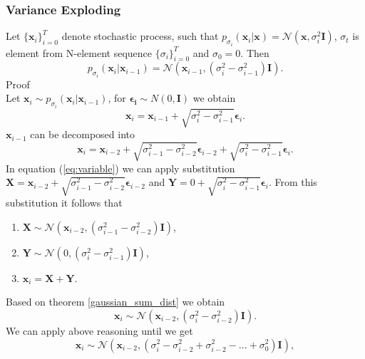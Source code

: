 \documentclass[10pt]{article}
\begin{document}
\subsubsection{Variance Exploding}
Let $\{ \textbf{x}_i \}_{i=0}^T$ denote stochastic process, such that $p_{\sigma_i}(\textbf{x}_i | \textbf{x}) = \mathcal{N}(\textbf{x}, \sigma_i^2 \mathbf{I})$, $\sigma_t$ is element from N-element sequence $\{ \sigma_i\}_{i=0}^T$ and $\sigma_0 = 0$. Then
\begin{equation}
    p_{\sigma_i}(\textbf{x}_i | \textbf{x}_{i-1}) = \mathcal{N}(\textbf{x}_{i-1},
    (\sigma_i^2 - \sigma_{i-1}^2) \mathbf{I}).
\end{equation}
Proof \\ 
Let $\textbf{x}_i \sim  p_{\sigma_i}(\textbf{x}_i | \textbf{x}_{i-1})$, for $\bm{\epsilon_{i}} \sim N(0, \mathbf{I}) $ we obtain
\begin{equation} \label{eq:ve_dics}
        \textbf{x}_i = \textbf{x}_{i-1} +  \sqrt{\sigma_i^2 - \sigma_{i-1}^2} \bm{\epsilon}_{i}.
\end{equation}
$\textbf{x}_{i-1}$ can be decomposed into 
\begin{equation}
\label{eq:variable}
        \textbf{x}_i = \textbf{x}_{i-2} + \sqrt{\sigma_{i-1}^2 - \sigma_{i-2}^2} \bm{\epsilon}_{i-2} +  \sqrt{\sigma_i^2 - \sigma_{i-1}^2} \bm{\epsilon}_{i}.
\end{equation}
In equation (\ref{eq:variable}) we can apply substitution  $\textbf{X} = \textbf{x}_{i-2} + \sqrt{\sigma_{i-1}^2 - \sigma_{i-2}^2} \bm{\epsilon}_{i-2}$ and $\textbf{Y} = 0 + \sqrt{\sigma_i^2 - \sigma_{i-1}^2} \bm{\epsilon}_{i}$. From this substitution it follows that
\begin{enumerate}
    \item $\textbf{X} \sim \mathcal{N}( \textbf{x}_{i-2},(\sigma_{i-1}^2 - \sigma_{i-2}^2)\mathbf{I}) $,
    \item $\textbf{Y} \sim \mathcal{N}( 0,(\sigma_{i}^2 - \sigma_{i-1}^2)\mathbf{I}) $,
    \item $ \textbf{x}_i = \textbf{X} + \textbf{Y}$.
\end{enumerate}
Based on theorem \ref{gaussian_sum_dist} we obtain 
\begin{equation}
    \textbf{x}_i \sim \mathcal{N} ( \textbf{x}_{i-2},(\sigma_{i}^2  - \sigma_{i-2}^2)\mathbf{I} ).
\end{equation}
We can apply above reasoning until we get
\begin{equation}
    \textbf{x}_i \sim \mathcal{N} ( \textbf{x}_{i-2},(\sigma_{i}^2  - \sigma_{i-2}^2 + \sigma_{i-2}^2  - ... + \sigma_0^2)\mathbf{I} ),
\end{equation}
\end{document}
